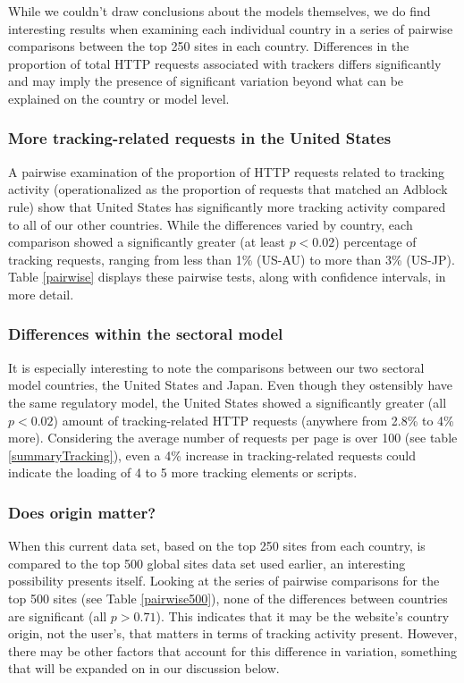 \documentclass[conference]{IEEEtran}
\begin{document}
While we couldn't draw conclusions about the models themselves, we do find interesting results when examining each individual country in a series of pairwise comparisons between the top 250 sites in each country.  Differences in the proportion of total HTTP requests associated with trackers differs significantly and may imply the presence of significant variation beyond what can be explained on the country or model level.

\subsubsection{More tracking-related requests in the United States}
A pairwise examination of the proportion of HTTP requests related to tracking activity (operationalized as the proportion of requests that matched an Adblock rule) show that United States has significantly more tracking activity compared to all of our other countries. While the differences varied by country, each comparison showed a significantly greater (at least $p<0.02$) percentage of tracking requests, ranging from less than 1\% (US-AU) to more than 3\% (US-JP). Table \ref{pairwise} displays these pairwise tests, along with confidence intervals, in more detail.

\subsubsection{Differences within the sectoral model}
It is especially interesting to note the comparisons between our two sectoral model countries, the United States and Japan. Even though they ostensibly have the same regulatory model, the United States showed a significantly greater (all $p<0.02$) amount of tracking-related HTTP requests (anywhere from 2.8\% to 4\% more). Considering the average number of requests per page is over 100 (see table \ref{summaryTracking}), even a 4\% increase in tracking-related requests could indicate the loading of 4 to 5 more tracking elements or scripts.

\subsubsection{Does origin matter?}
When this current data set, based on the top 250 sites from each country, is compared to the top 500 global sites data set used earlier, an interesting possibility presents itself. Looking at the series of pairwise comparisons for the top 500 sites (see Table \ref{pairwise500}), none of the differences between countries are significant (all $p>0.71$). This indicates that it may be the website's country origin, not the user's, that matters in terms of tracking activity present. However, there may be other factors that account for this difference in variation, something that will be expanded on in our discussion below.
\end{document}
